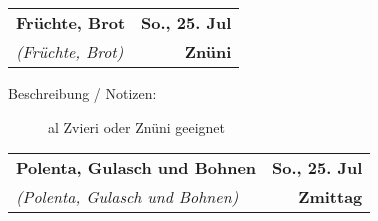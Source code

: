 \documentclass[11pt,a4paper]{article}%
\begin{document}
%
\clearpage%
\pagebreak%
\renewcommand{\arraystretch}{1.75}%
%
%


\begin{table}%
\begin{tabularx}{\textwidth}{X r}%
\LARGE \textbf{Früchte, Brot}&\color{gray} \large \textbf{So., 25. Jul}\\%
\small \textit{(Früchte, Brot)}&\color{gray} \large \textbf{Znüni}\\%
\hline%
\end{tabularx}%
\end{table}

%
\begin{description}%
\item[Beschreibung / Notizen:]%
al Zvieri oder Znüni geeignet%
\end{description}%
\vspace{0.75cm}%
\renewcommand{\arraystretch}{1.25}%
\clearpage%
\pagebreak%
\renewcommand{\arraystretch}{1.75}%
%
%


\begin{table}%
\begin{tabularx}{\textwidth}{X r}%
\LARGE \textbf{Polenta, Gulasch und Bohnen}&\color{gray} \large \textbf{So., 25. Jul}\\%
\small \textit{(Polenta, Gulasch und Bohnen)}&\color{gray} \large \textbf{Zmittag}\\%
\hline%
\end{tabularx}%
\end{table}

%
%
\vspace{0.75cm}%
\renewcommand{\arraystretch}{1.25}%
\end{document}
